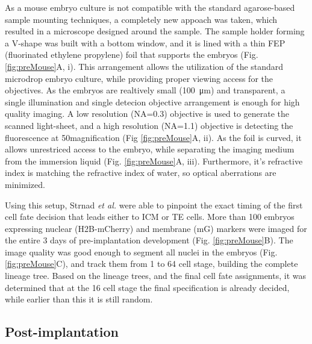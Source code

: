     As a mouse embryo culture is not compatible with the standard agarose-based sample mounting techniques, a completely new appoach was taken, which resulted in a microscope designed around the sample. The sample holder forming a V-shape was built with a bottom window, and it is lined with a thin FEP (fluorinated ethylene propylene) foil that supports the embryos (Fig. \ref{fig:preMouse}A, i). This arrangement allows the utilization of the standard microdrop embryo culture, while providing proper viewing access for the objectives. As the embryos are realtively small (\SI{100}{\micro m}) and transparent, a single illumination and single detecion objective arrangement is enough for high quality imaging. A low resolution (NA=0.3) objective is used to generate the scanned light-sheet, and a high resolution (NA=1.1) objective is detecting the fluorescence at 50\texttimes magnification (Fig \ref{fig:preMouse}A, ii). As the foil is curved, it allows unrestriced access to the embryo, while separating the imaging medium from the immersion liquid (Fig. \ref{fig:preMouse}A, iii). Furthermore, it's refractive index is matching the refractive index of water, so optical aberrations are minimized.

    Using this setup, Strnad \textit{et al.} were able to pinpoint the exact timing of the first cell fate decision that leads either to ICM or TE cells. More than 100 embryos expressing nuclear (H2B-mCherry) and membrane (mG) markers were imaged for the entire 3 days of pre-implantation development (Fig. \ref{fig:preMouse}B). The image quality was good enough to segment all nuclei in the embryos (Fig. \ref{fig:preMouse}C), and track them from 1 to 64 cell stage, building the complete lineage tree. Based on the lineage trees, and the final cell fate assignments, it was determined that at the 16 cell stage the final specification is already decided, while earlier than this it is still random.
    

  \subsection{Post-implantation}
  
